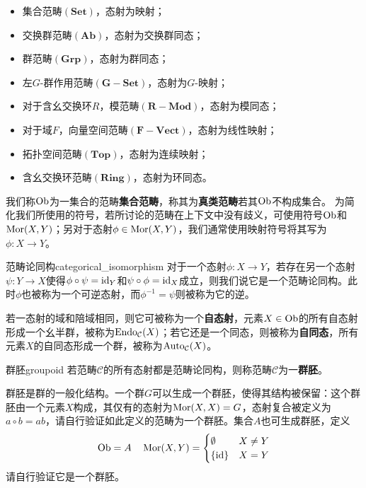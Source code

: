 \documentclass[../main.tex]{subfiles}
\begin{document}
\begin{itemize}
    \item 集合范畴$(\mathbf{Set})$，态射为映射；
    \item 交换群范畴$(\mathbf{Ab})$，态射为交换群同态；
    \item 群范畴$(\mathbf{Grp})$，态射为群同态；
    \item 左$G$-群作用范畴$(\mathbf{G{-}Set})$，态射为$G$-映射；
    \item 对于含幺交换环$R$，模范畴$(\mathbf{R{-}Mod})$，态射为模同态；
    \item 对于域$F$，向量空间范畴$(\mathbf{F{-}Vect})$，态射为线性映射；
    \item 拓扑空间范畴$(\mathbf{Top})$，态射为连续映射；
    \item 含幺交换环范畴$(\mathbf{Ring})$，态射为环同态。
\end{itemize}
我们称$\operatorname{Ob}$为一集合的范畴\textbf{集合范畴}，称其为\textbf{真类范畴}若其$\operatorname{Ob}$不构成集合。
为简化我们所使用的符号，若所讨论的范畴在上下文中没有歧义，可使用符号$\operatorname{Ob}$和$\operatorname{Mor}(X,Y)$；另对于态射$\phi\in\operatorname{Mor}(X,Y)$，我们通常使用映射符号将其写为$\phi:X\to Y$。

\begin{definition}{范畴论同构}{categorical_isomorphism}
对于一个态射$\phi:X\to Y$，若存在另一个态射$\psi:Y\to X$使得$\phi\circ\psi=\operatorname{id}_Y$和$\psi\circ\phi=\operatorname{id}_X$成立，则我们说它是一个范畴论同构。此时$\phi$也被称为一个可逆态射，而$\phi^{-1}=\psi$则被称为它的逆。
\end{definition}
若一态射的域和陪域相同，则它可被称为一个\textbf{自态射}，元素$X\in\operatorname{Ob}$的所有自态射形成一个幺半群，被称为$\operatorname{Endo}_\mathcal{C}(X)$；若它还是一个同态，则被称为\textbf{自同态}，所有元素$X$的自同态形成一个群，被称为$\operatorname{Auto}_\mathcal{C}(X)$。

\begin{definition}{群胚}{groupoid}
若范畴$\mathcal{C}$的所有态射都是范畴论同构，则称范畴$\mathcal{C}$为一\textbf{群胚}。
\end{definition}
群胚是群的一般化结构。一个群$G$可以生成一个群胚，使得其结构被保留：这个群胚由一个元素$X$构成，其仅有的态射为$\operatorname{Mor}(X,X)=G$，态射复合被定义为$a\circ b=ab$，请自行验证如此定义的范畴为一个群胚。集合$A$也可生成群胚，定义$$\operatorname{Ob}=A\quad\operatorname{Mor}(X,Y)=\begin{cases}\emptyset&X\neq Y\\\{\operatorname{id}\}&X=Y\end{cases}$$请自行验证它是一个群胚。
\end{document}
